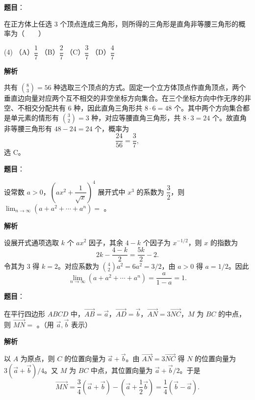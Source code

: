 \begin{answer}

\textbf{题目}：

在正方体上任选 3 个顶点连成三角形，则所得的三角形是直角非等腰三角形的概率为\mbox{（　　）}

\begin{gkopts}(4)
\task （A）$\dfrac17$
\task （B）$\dfrac27$
\task （C）$\dfrac37$
\task （D）$\dfrac47$
\end{gkopts}

\textbf{解析}

共有 $\binom83=56$ 种选取三个顶点的方式。固定一个立方体顶点作直角顶点，两个垂直边向量对应两个互不相交的非空坐标方向集合。在三个坐标方向中作无序的非空、不相交分配共有 $6$ 种，因此直角三角形共 $8\cdot6=48$ 个。其中两个方向集合都是单元素的情形有 $\binom32=3$ 种，对应等腰直角三角形，共 $8\cdot3=24$ 个。故直角非等腰三角形有 $48-24=24$ 个，概率为
\nopagebreak[4]
\[
\frac{24}{56}=\frac37,
\]
选 C。


\end{answer}
\begin{answer}

\textbf{题目}：

设常数 $a>0$，$(ax^2+\dfrac{1}{\sqrt{x}})^4$ 展开式中 $x^3$ 的系数为 $\dfrac32$，则 $\displaystyle\lim_{n\to\infty}(a+a^2+\cdots+a^n)=$ \gkblank{}。

\textbf{解析}

设展开式通项选取 $k$ 个 $ax^2$ 因子，其余 $4-k$ 个因子为 $x^{-1/2}$，则 $x$ 的指数为
\nopagebreak[4]
\[
2k-\frac{4-k}{2}=\frac{5k}{2}-2.
\]
令其为 $3$ 得 $k=2$。对应系数为 $\binom42a^2=6a^2=3/2$，由 $a>0$ 得 $a=1/2$。因此
\nopagebreak[4]
\[
\lim_{n\to\infty}(a+a^2+\cdots+a^n)
=\frac{a}{1-a}=1.
\]


\end{answer}
\begin{answer}

\textbf{题目}：

在平行四边形 $ABCD$ 中，$\overrightarrow{AB}=\vec a$，$\overrightarrow{AD}=\vec b$，$\overrightarrow{AN}=3\overrightarrow{NC}$，$M$ 为 $BC$ 的中点，则 $\overrightarrow{MN}=$ \gkblank{}。（用 $\vec a,\vec b$ 表示）

\textbf{解析}

以 $A$ 为原点，则 $C$ 的位置向量为 $\vec a+\vec b$。由 $\overrightarrow{AN}=3\overrightarrow{NC}$ 得 $N$ 的位置向量为 $3(\vec a+\vec b)/4$。又 $M$ 为 $BC$ 中点，其位置向量为 $\vec a+\vec b/2$。于是
\nopagebreak[4]
\[
\overrightarrow{MN}
=\frac34(\vec a+\vec b)-\left(\vec a+\frac12\vec b\right)
=\frac14(\vec b-\vec a).
\]


\end{answer}
